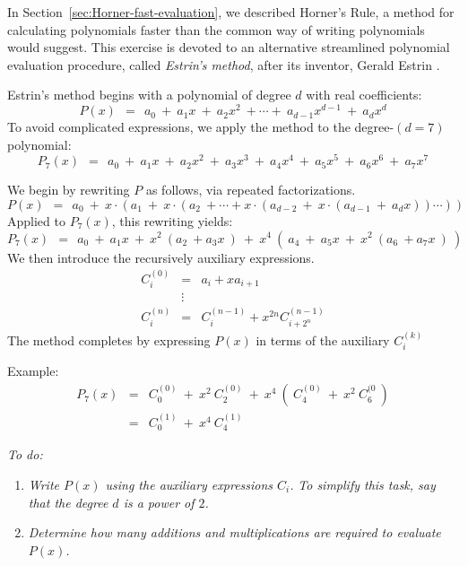 \begin{itemize}
\smallskip

In Section~\ref{sec:Horner-fast-evaluation}, we described Horner's Rule, a method for calculating polynomials faster than the common way of writing polynomials would suggest.  This exercise is devoted to an alternative streamlined polynomial evaluation procedure, called {\it Estrin's method}, after its inventor, Gerald Estrin \cite{Estrin60}.

 

\smallskip

Estrin's method begins with a polynomial of degree $d$ with real coefficients:
\[
P(x) \ \ = \ \ a_0 \ + \ a_1 x \ + \ a_2 x^2 \ + \cdots + \ a_{d-1} x^{d-1} \ + \ a_d x^d
\]
To avoid complicated expressions, we apply the method to the degree-$(d=7)$ polynomial:
\[
P_7(x) \ \ = \ \ a_0 \ + \ a_1 x \ + \ a_2 x^2 \ + \ a_3 x^3 \ + \ a_4 x^4 \ + \ a_5 x^5 \ + \ a_6 x^6 \ + \ a_7 x^7
\]

\smallskip

We begin by rewriting $P$ as follows, via repeated factorizations.
\[
P(x) \ \ = \ \ a_0 \ + \ x \cdot (a_1 \ + \ x \cdot (a_2  \ +  \cdots                                          
+ x \cdot (a_{d-2} \ + \ x \cdot (a_{d-1} \ + \ a_d x)) \cdots ))
\]
Applied to $P_7(x)$, this rewriting yields:
\[
P_7(x) \ \ = \ \ a_0 \ + \ a_1 x \ + \ x^2 \ ( a_2  \ + a_3 x \ ) \ + \ x^4 \ ( \ a_4 \ + \ a_5 x \ + \ x^2 \ ( a_6  \ + a_7 x \ ) \ )
\]
We then introduce the recursively auxiliary expressions.  
\begin{eqnarray*}
C_i^{(0)} & = & a_i + x a_{i+1} \\
                &\vdots &  \\
C_i^{(n)}  & = & C_i^{(n-1)} + x^{2n} C_{i+2^n}^{(n-1)}
\end{eqnarray*}
The method completes by expressing $P(x)$ in terms of the auxiliary $C_i^{(k)}$

\smallskip

Example:
\begin{eqnarray*}
P_7(x) & = & C_{0}^{(0)} \ + \ x^2 \ C_2^{(0)} \ + \ x^4 \ ( \ C_4^{(0)} \ + \ x^2 \ C_6^{(0} \ ) \\
            & = & C_0^{(1)} \ + \ x^4 \ C_4^{(1)}
\end{eqnarray*}

\medskip

{\em To do:}
\begin{enumerate}
\item
{\em Write $P(x)$ using the auxiliary expressions $C_i$.}  {\em To simplify this task, say that the degree $d$ is a power of $2$.}
\medskip\item
{\em Determine how many additions and multiplications are required to evaluate $P(x)$.}
\end{enumerate}
\end{itemize}


